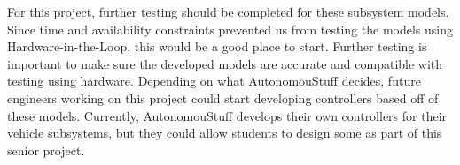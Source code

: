 \documentclass[conference]{IEEEtran}
\begin{document}
For this project, further testing should be completed for these subsystem models. Since time and availability constraints prevented us from testing the models using Hardware-in-the-Loop, this would be a good place to start. Further testing is important to make sure the developed models are accurate and compatible with testing using hardware. Depending on what AutonomouStuff decides, future engineers working on this project could start developing controllers based off of these models. Currently, AutonomouStuff develops their own controllers for their vehicle subsystems, but they could allow students to design some as part of this senior project.



\end{document}
